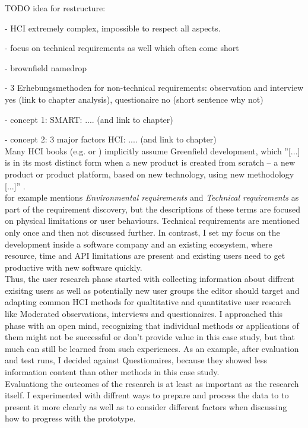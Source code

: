 TODO idea for restructure:

- HCI extremely complex, impossible to respect all aspects.

- focus on technical requirements as well which often come short

- brownfield namedrop

- 3 Erhebungsmethoden for non-technical requirements: observation and interview yes (link to chapter analysis), questionaire no (short sentence why not)

- concept 1: SMART: .... (and link to chapter)

- concept 2: 3 major factors HCI: .... (and link to chapter)
\\
Many HCI books (e.g. \cite{Interactiondesign:2019ys} or \cite{LearnHCI:2020ys}) implicitly assume \label{def:Greenfield} Greenfield development,
which ''[...] is in its most distinct form when a new product is created from scratch – a new product or product platform, based on new technology, using new methodology [...]'' \cite{BrownfieldToGreenfield:2021ys}.
\\
\cite[p. 392]{Interactiondesign:2019ys} for example mentions \textit{Environmental requirements} and \textit{Technical requirements} as part of the requirement discovery, but the descriptions of these terms are focused on physical limitations or user behaviours. Technical requirements are mentioned only once and then not discussed further.
In contrast, I set my focus on the development inside a software company and an existing ecosystem, where resource, time and API limitations are present and existing users need to get productive with new software quickly.
\\
Thus, the user research phase started with collecting information about diffrent exisitng users as well as potentially new user groups the editor should target and adapting common HCI methods for qualtitative and quantitative user research like Moderated observations, interviews and questionaires.
I approached this phase with an open mind, recognizing that individual methods or applications of them might not be successful or don't provide value in this case study, but that much can still be learned from such experiences. As an example, after evaluation and test runs, I decided against Questionaires, because they showed less information content than other methods in this case study.
\\
Evaluationg the outcomes of the research is at least as important as the research itself.
I experimented with diffrent ways to prepare and process the data to to present it more clearly as well as to consider different factors when discussing how to progress with the prototype.

